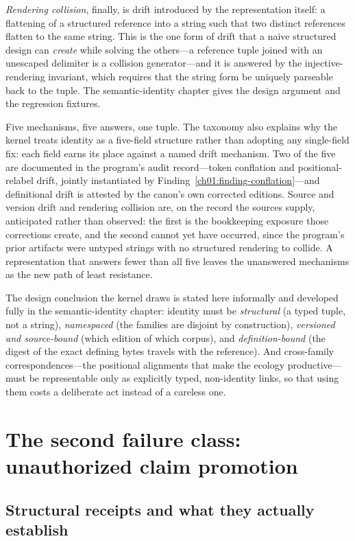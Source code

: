 \emph{Rendering collision}, finally, is drift introduced by the
representation itself: a flattening of a structured reference into a
string such that two distinct references flatten to the same string.
This is the one form of drift that a naive structured design can
\emph{create} while solving the others---a reference tuple joined with
an unescaped delimiter is a collision generator---and it is answered by
the injective-rendering invariant, which requires that the string form
be uniquely parseable back to the tuple. The semantic-identity chapter
gives the design argument and the regression fixtures.

Five mechanisms, five answers, one tuple. The taxonomy also explains why
the kernel treats identity as a five-field structure rather than
adopting any single-field fix: each field earns its place against a
named drift mechanism. Two of the five are documented in the program's
audit record---token conflation and positional-relabel drift, jointly
instantiated by Finding~\ref{ch01:finding-conflation}---and definitional
drift is attested by the canon's own corrected editions. Source and
version drift and rendering collision are, on the record the sources
supply, anticipated rather than observed: the first is the bookkeeping
exposure those corrections create, and the second cannot yet have
occurred, since the program's prior artifacts were untyped strings with
no structured rendering to collide. A representation that
answers fewer than all five leaves the unanswered mechanisms as the new
path of least resistance.

The design conclusion the kernel draws is stated here informally and
developed fully in the semantic-identity chapter: identity must be
\emph{structural} (a typed tuple, not a string), \emph{namespaced} (the
families are disjoint by construction), \emph{versioned and
source-bound} (which edition of which corpus), and \emph{definition-bound}
(the digest of the exact defining bytes travels with the reference). And
cross-family correspondences---the positional alignments that make the
ecology productive---must be representable only as explicitly typed,
non-identity links, so that using them costs a deliberate act instead of a
careless one.

\section{The second failure class: unauthorized claim promotion}\label{ch01:promotion}

\subsection{Structural receipts and what they actually establish}\label{ch01:receipts}

